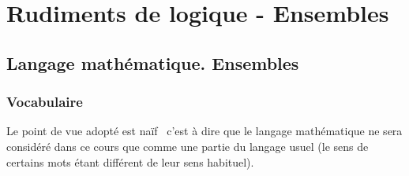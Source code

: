 

\section{Rudiments de logique - Ensembles}
\subsection{Langage mathématique. Ensembles}
\subsubsection{Vocabulaire}
Le point de vue adopté est \og naïf\fg~ c'est à dire que le langage mathématique ne sera considéré dans ce cours que comme une partie du langage usuel (le sens de certains mots étant différent de leur sens habituel).

